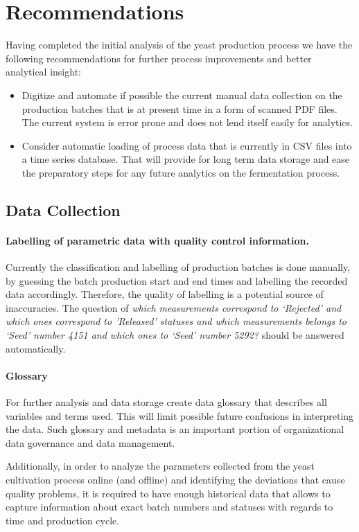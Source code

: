 \section{Recommendations}
Having completed the initial analysis of the yeast production process we have the following recommendations for further process improvements and better analytical insight:

\begin{itemize}
\item Digitize and automate if possible the current manual data collection on the production batches that is at present time in a form of scanned PDF files. The current system is error prone and does not lend itself easily for analytics.
\item Consider automatic loading of process data that is currently in CSV files into a time series database. That will provide for long term data storage and ease the preparatory steps for any future analytics on the fermentation process.
\end{itemize}

\subsection{Data Collection}
\paragraph{Labelling of parametric data with quality control information.}
Currently the classification and labelling of production batches is done manually, by guessing the batch production start and end times and labelling the recorded data accordingly. Therefore, the quality of labelling is a potential source of inaccuracies. The question of \emph{which measurements correspond to ‘Rejected’ and which ones correspond to ’Released’ statuses and  which measurements belongs to ‘Seed’ number 4151 and which ones to ‘Seed’ number 5292?} should be answered automatically.

\paragraph{Glossary} For further analysis and data storage create data glossary that describes all variables and terms used. This will limit possible future confusions in interpreting the data. Such glossary and metadata is an important portion of organizational data governance and data management.

Additionally, in order to analyze the parameters collected from the yeast cultivation process online (and offline) and identifying the deviations that cause quality problems, it is required to have enough historical data that allows to capture information about exact batch numbers and statuses with regards to time and production cycle. 

